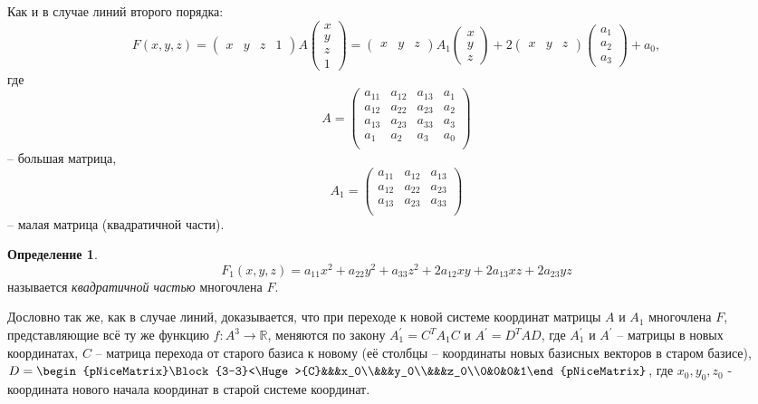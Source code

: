 \documentclass[a4paper, 12pt]{article}
\theoremstyle{definition}
\newtheorem*{definition}{Определение}
\begin{document}
Как и в случае линий второго порядка:
\[ F(x,y,z) = \begin{pmatrix}
    x & y & z & 1
\end{pmatrix}
A
\begin{pmatrix}
    x \\ y \\ z \\ 1
\end{pmatrix}
=
\begin{pmatrix}
    x & y & z
\end{pmatrix}
A_1
\begin{pmatrix}
    x \\ y \\ z
\end{pmatrix} 
+ 2 \begin{pmatrix}
    x & y & z
\end{pmatrix}
\begin{pmatrix}
    a_1 \\ a_2 \\ a_3
\end{pmatrix} 
+ a_0,
\]
где
\[ A =
\begin{pmatrix}
    a_{11} & a_{12} & a_{13} & a_{1} \\
    a_{12} & a_{22} & a_{23} & a_{2} \\
    a_{13} & a_{23} & a_{33} & a_{3} \\
    a_{1} & a_{2} & a_{3} & a_{0} \\
\end{pmatrix}
\] – большая матрица,
\[ A_1 =
\begin{pmatrix}
    a_{11} & a_{12} & a_{13} \\
    a_{12} & a_{22} & a_{23} \\
    a_{13} & a_{23} & a_{33} \\
\end{pmatrix}
\] – малая матрица (квадратичной части).

\begin{definition}
    \[ F_1(x, y, z) = a_{11} x^2 + a_{22} y^2 + a_{33} z^2 + 2a_{12} xy + 2a_{13} xz + 2a_{23} yz\]
    называется \textit{квадратичной частью} многочлена $F$.
\end{definition}

Дословно так же, как в случае линий, доказывается, что при переходе к новой системе координат матрицы $A$ и $A_1$ многочлена $F$, представляющие всё ту же функцию $f: A^3 \to \mathbb{R}$, меняются по закону $A_1^{'} = C^T A_1 C$ и $A^{'} = D^T A D$, где $A_1^{'}$ и $A^{'}$ – матрицы в новых координатах, $C$ – матрица перехода от старого базиса к новому (её столбцы – координаты новых базисных векторов в старом базисе),
$D = \begin{pNiceMatrix}\Block{3-3}<\Huge>{C}&&&x_0\\&&&y_0\\&&&z_0\\0&0&0&1\end{pNiceMatrix}$, где
$x_0, y_0, z_0$ - координата нового начала координат в старой системе координат.
\end{document}
